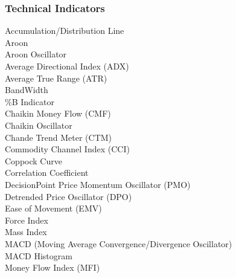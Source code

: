 \documentclass[12pt,a4paper]{article}
\begin{document}
\iffalse
[]
\fi

\iffalse
#################################################################################
\fi

\subsubsection*{Technical Indicators}

Accumulation/Distribution Line \\

Aroon \\

Aroon Oscillator \\

Average Directional Index (ADX) \\

Average True Range (ATR) \\

BandWidth \\

\%B Indicator \\

Chaikin Money Flow (CMF) \\

Chaikin Oscillator \\

Chande Trend Meter (CTM) \\

Commodity Channel Index (CCI) \\

Coppock Curve \\

Correlation Coefficient \\

DecisionPoint Price Momentum Oscillator (PMO) \\

Detrended Price Oscillator (DPO) \\

Ease of Movement (EMV) \\

Force Index \\

Mass Index \\

MACD (Moving Average Convergence/Divergence Oscillator) \\

MACD Histogram \\

Money Flow Index (MFI) \\
\end{document}
